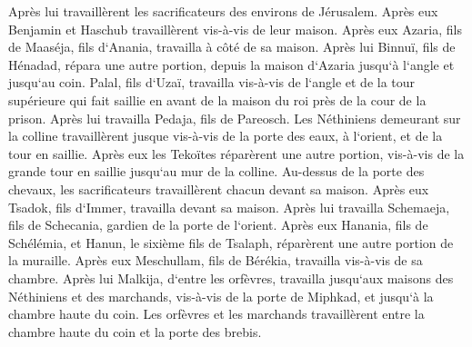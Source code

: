 \verse Après lui travaillèrent les sacrificateurs des environs de Jérusalem. 
\verse Après eux Benjamin et Haschub travaillèrent vis-à-vis de leur maison. Après eux Azaria, fils de Maaséja, fils d`Anania, travailla à côté de sa maison. 
\verse Après lui Binnuï, fils de Hénadad, répara une autre portion, depuis la maison d`Azaria jusqu`à l`angle et jusqu`au coin. 
\verse Palal, fils d`Uzaï, travailla vis-à-vis de l`angle et de la tour supérieure qui fait saillie en avant de la maison du roi près de la cour de la prison. Après lui travailla Pedaja, fils de Pareosch. 
\verse Les Néthiniens demeurant sur la colline travaillèrent jusque vis-à-vis de la porte des eaux, à l`orient, et de la tour en saillie. 
\verse Après eux les Tekoïtes réparèrent une autre portion, vis-à-vis de la grande tour en saillie jusqu`au mur de la colline. 
\verse Au-dessus de la porte des chevaux, les sacrificateurs travaillèrent chacun devant sa maison. 
\verse Après eux Tsadok, fils d`Immer, travailla devant sa maison. Après lui travailla Schemaeja, fils de Schecania, gardien de la porte de l`orient. 
\verse Après eux Hanania, fils de Schélémia, et Hanun, le sixième fils de Tsalaph, réparèrent une autre portion de la muraille. Après eux Meschullam, fils de Bérékia, travailla vis-à-vis de sa chambre. 
\verse Après lui Malkija, d`entre les orfèvres, travailla jusqu`aux maisons des Néthiniens et des marchands, vis-à-vis de la porte de Miphkad, et jusqu`à la chambre haute du coin. 
\verse Les orfèvres et les marchands travaillèrent entre la chambre haute du coin et la porte des brebis. 

\chapter{}

